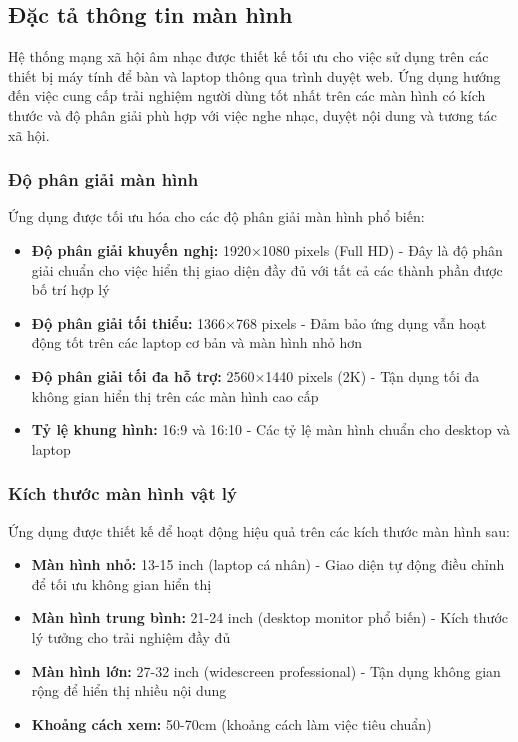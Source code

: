 \subsection{Đặc tả thông tin màn hình}

Hệ thống mạng xã hội âm nhạc được thiết kế tối ưu cho việc sử dụng trên các thiết bị máy tính để bàn và laptop thông qua trình duyệt web. Ứng dụng hướng đến việc cung cấp trải nghiệm người dùng tốt nhất trên các màn hình có kích thước và độ phân giải phù hợp với việc nghe nhạc, duyệt nội dung và tương tác xã hội.

\subsubsection{Độ phân giải màn hình}

Ứng dụng được tối ưu hóa cho các độ phân giải màn hình phổ biến:

\begin{itemize}
    \item \textbf{Độ phân giải khuyến nghị:} 1920×1080 pixels (Full HD) - Đây là độ phân giải chuẩn cho việc hiển thị giao diện đầy đủ với tất cả các thành phần được bố trí hợp lý
    \item \textbf{Độ phân giải tối thiểu:} 1366×768 pixels - Đảm bảo ứng dụng vẫn hoạt động tốt trên các laptop cơ bản và màn hình nhỏ hơn
    \item \textbf{Độ phân giải tối đa hỗ trợ:} 2560×1440 pixels (2K) - Tận dụng tối đa không gian hiển thị trên các màn hình cao cấp
    \item \textbf{Tỷ lệ khung hình:} 16:9 và 16:10 - Các tỷ lệ màn hình chuẩn cho desktop và laptop
\end{itemize}

\subsubsection{Kích thước màn hình vật lý}

Ứng dụng được thiết kế để hoạt động hiệu quả trên các kích thước màn hình sau:

\begin{itemize}
    \item \textbf{Màn hình nhỏ:} 13-15 inch (laptop cá nhân) - Giao diện tự động điều chỉnh để tối ưu không gian hiển thị
    \item \textbf{Màn hình trung bình:} 21-24 inch (desktop monitor phổ biến) - Kích thước lý tưởng cho trải nghiệm đầy đủ
    \item \textbf{Màn hình lớn:} 27-32 inch (widescreen professional) - Tận dụng không gian rộng để hiển thị nhiều nội dung
    \item \textbf{Khoảng cách xem:} 50-70cm (khoảng cách làm việc tiêu chuẩn)
\end{itemize}


